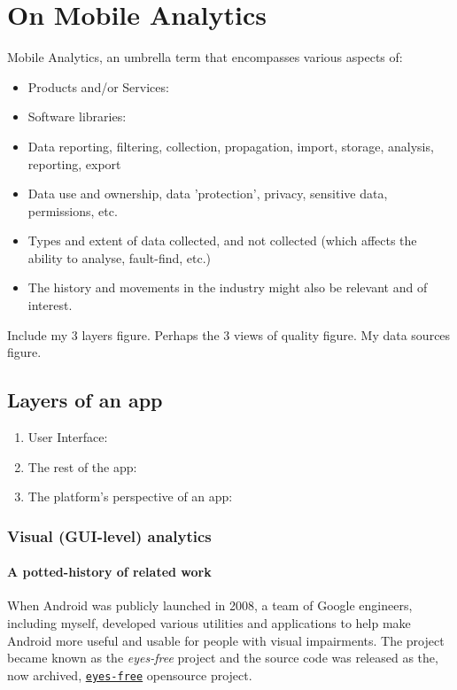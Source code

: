 \chapter{On Mobile Analytics}
Mobile Analytics, an umbrella term that encompasses various aspects of:
\begin{itemize}
    \item Products and/or Services:
    \item Software libraries:
    \item Data reporting, filtering, collection, propagation, import, storage, analysis, reporting, export
    \item Data use and ownership, data 'protection', privacy, sensitive data, permissions, etc.
    \item Types and extent of data collected, and not collected (which affects the ability to analyse, fault-find, etc.)
    \item The history and movements in the industry might also be relevant and of interest.
\end{itemize}

Include my 3 layers figure. Perhaps the 3 views of quality figure. My data sources figure. 

\section{Layers of an app}
\begin{enumerate}
    \item User Interface:
    \item The rest of the app:
    \item The platform's perspective of an app:
\end{enumerate}

\subsection{Visual (GUI-level) analytics}

\subsubsection{A potted-history of related work}
When Android was publicly launched in 2008, a team of Google engineers, including myself, developed various utilities and applications to help make Android more useful and usable for people with visual impairments. The project became known as the \emph{eyes-free} project and the source code was released as the, now archived, \href{https://code.google.com/archive/p/eyes-free/}{\texttt{eyes-free}} opensource project. 

